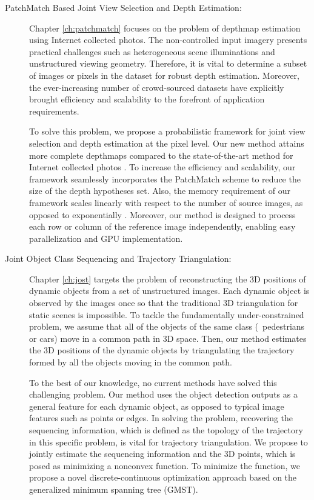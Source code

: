 \begin{description}

\item[PatchMatch Based Joint View Selection and Depth Estimation:]
Chapter \ref{ch:patchmatch} focuses on the problem of depthmap estimation using Internet collected photos. The non-controlled input imagery presents practical challenges such as heterogeneous scene illuminations and unstructured viewing geometry. Therefore, it is vital to determine a subset of images or pixels in the dataset for robust depth estimation. Moreover, the ever-increasing number of crowd-sourced datasets have explicitly brought efficiency and scalability to the forefront of application requirements.

To solve this problem, we propose a probabilistic framework for joint view selection and depth estimation at the pixel level. Our new method attains more complete depthmaps compared to the state-of-the-art method for Internet collected photos \cite{Goesele07}. To increase the efficiency and scalability, our framework seamlessly incorporates the PatchMatch scheme \cite{patchMatchStereo1} to  reduce the size of the depth hypotheses set. Also, the memory requirement of our framework scales linearly with respect to the number of source images, as opposed to exponentially \cite{CombinedDepthOutlier}. Moreover, our method is designed to process each row or column of the reference image independently, enabling easy parallelization and GPU implementation.

\item[Joint Object Class Sequencing and Trajectory Triangulation:]
Chapter \ref{ch:jost} targets the problem of reconstructing the 3D positions of dynamic objects from a set of unstructured images. Each dynamic object is observed by the images once so that the traditional 3D triangulation for static scenes is impossible. To tackle the fundamentally under-constrained problem, we assume that all of the objects of the same class (\eg~pedestrians or cars) move in a common path in 3D space. Then, our method estimates the 3D positions of the dynamic objects by triangulating the trajectory formed by all the objects moving in the common path. 

To the best of our knowledge, no current methods have solved this challenging problem. 
Our method uses the object detection outputs as a general feature for each dynamic object, as opposed to typical image features such as points or edges. In solving the problem, recovering the sequencing information, which is defined as the topology of the trajectory in this specific problem, is vital for trajectory triangulation. We propose to jointly estimate the sequencing information and the 3D points, which is posed as minimizing a nonconvex function. To minimize the function, we propose a novel discrete-continuous optimization approach based on the generalized minimum spanning tree (GMST). 


\end{description}
